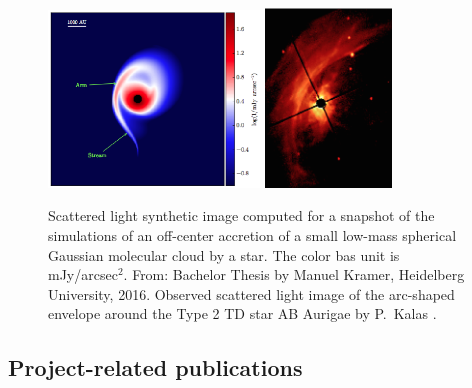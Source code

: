 \documentclass[10pt,fleqn,twoside]{article}
\begin{document}
\begin{figure}
\centerline{\includegraphics[width=0.5\textwidth]{D2Fig/Kramer_Fig4.12.eps}
\hspace{2em}\includegraphics[width=0.3\textwidth]{D2Fig/Kalas.eps}
}
\caption{\label{fig-kramer-4.12} Scattered light
  synthetic image computed for a snapshot of the simulations of an
  off-center accretion of a small low-mass spherical Gaussian molecular
  cloud by a star. The color bas unit is mJy/arcsec$^2$. From: Bachelor
  Thesis by Manuel Kramer, Heidelberg University,
  2016.  Observed scattered light image of the
  arc-shaped envelope around the Type 2 TD star AB Aurigae by P.~Kalas
  \citep{1999ApJ...523L.151G}.}
\end{figure}





\subsection{Project-related publications}

\end{document}
